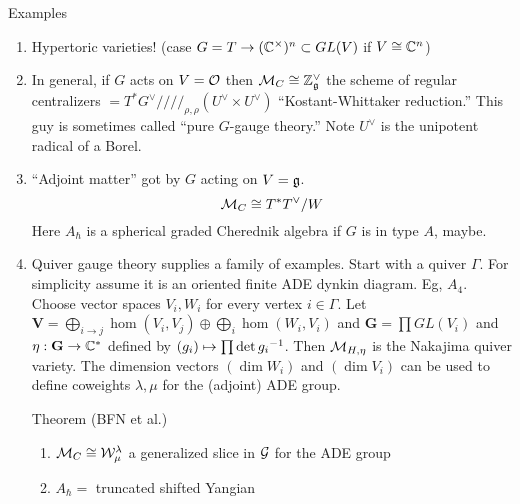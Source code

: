 Examples
\begin{enumerate}
    \item Hypertoric varieties! (case $G = T\rightarrow (\mathbb{C}^\times)^n \subset GL(V)$ if $V\cong \mathbb{C}^n$)
    \item In general, if $G$ acts on $V = {\mathcal{O}}$ then $\mathcal{M}_C\cong \mathbb{Z}_{\mathfrak{g}}^\vee$ the scheme of regular centralizers $ = T^\ast G^\vee ////_{\rho,\rho}(U^\vee\times U^\vee)$ ``Kostant-Whittaker reduction.'' This guy is sometimes called ``pure $G$-gauge theory.'' Note $U^\vee$ is the unipotent radical of a Borel. 
    \item ``Adjoint matter'' got by $G$ acting on $V = \mathfrak{g}$. $$\mathcal{M}_C\cong T^\ast T^\vee/W$$ Here $A_\hbar$ is a spherical graded Cherednik algebra if $G$ is in type $A$, maybe. 
    \item Quiver gauge theory supplies a family of examples. Start with a quiver $\Gamma$. For simplicity assume it is an oriented finite ADE dynkin diagram. Eg, $A_4$. Choose vector spaces $V_i,W_i$ for every vertex $i\in \Gamma$. Let
    $
    \mathbf{V} = \bigoplus_{i\rightarrow j} \hom(V_i,V_j)\oplus \bigoplus_{i}\hom(W_i,V_i)$ and $\mathbf{G} = \prod GL (V_i)$ and $\eta: \mathbf{G}\rightarrow \mathbb{C}^\ast$ defined by $(g_i)\mapsto \prod \det{g_i}^{-1}$. Then $\mathcal{M}_{H,\eta}$ is the Nakajima quiver variety. The dimension vectors $(\dim W_i)$ and $(\dim V_i)$ can be used to define coweights $\lambda,\mu$ for the (adjoint) ADE group. 

    Theorem (BFN et al.) \begin{enumerate}
        \item $\mathcal{M}_C\cong \mathcal{W}_\mu^\lambda$ a generalized slice in $\mathcal{G}$ for the ADE group 
        \item $A_{\hbar} = $ truncated shifted Yangian 
    \end{enumerate}


\end{enumerate}
